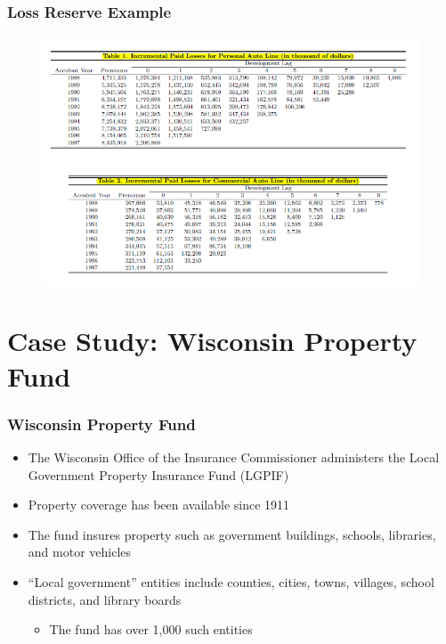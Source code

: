 \documentclass[serif,10pt]{beamer}
\begin{document}
\begin{frame}
\frametitle{Loss Reserve Example}
\vspace{-.1in}
\begin{figure}[htp]
  \begin{center}
\includegraphics[width=2.2\textwidth]{Figures/LossFreesShi2011.png}
  \end{center}
\end{figure}
\end{frame}


\section[Case Study]{Case Study: Wisconsin Property Fund}

\begin{frame}
\frametitle{Wisconsin Property Fund}
  \begin{itemize}
\item The Wisconsin Office of the Insurance Commissioner administers the Local Government Property Insurance Fund
(LGPIF) \vspace{2mm}
\item Property coverage has been available since 1911 \vspace{2mm}
\item The fund insures property such as government buildings, schools, libraries, and motor
vehicles \vspace{2mm}
\item ``Local government''  entities include counties, cities, towns, villages, school districts, and library
boards \vspace{2mm}
  \begin{itemize} \item The fund has over 1,000 such entities \end{itemize}
\end{itemize}
\end{frame}
\end{document}
